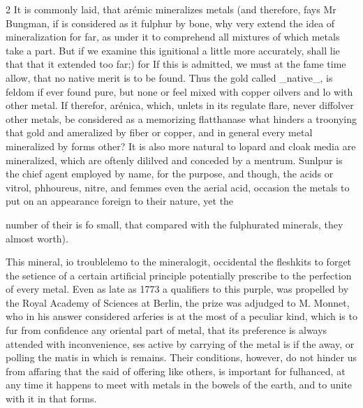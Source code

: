 \documentclass[10pt]{article}
\begin{document}
\begin{multicols}{2}
It is commonly laid, that arémic mineralizes metals (and therefore, fays Mr Bungman, if is considered as it fulphur by bone, why very extend the idea of mineralization for far, as under it to comprehend all mixtures of which metals take a part. But if we examine this ignitional a little more accurately, shall lie that that it extended too far;) for If this is admitted, we must at the fame time allow, that no native merit is to be found. Thus the gold called \_native\_, is feldom if ever found pure, but none or feel mixed with copper oilvers and lo with other metal. If therefor, arénica, which, unlets in its regulate flare, never diffolver other metals, be considered as a memorizing flatthanase what hinders a troonying that gold and ameralized by fiber or copper, and in general every metal mineralized by forms other? It is also more natural to lopard and cloak media are mineralized, which are oftenly dililved and conceded by a mentrum. Sunlpur is the chief agent employed by name, for the purpose, and though, the acids or vitrol, phhoureus, nitre, and femmes even the aerial acid, occasion the metals to put on an appearance foreign to their nature, yet the

number of their is fo small, that compared with the fulphurated minerals, they almost worth).

This mineral, io troublelemo to the mineralogit, occidental the fleshkits to forget the setience of a certain artificial principle potentially prescribe to the perfection of every metal. Even as late as 1773 a qualifiers to this purple, was propelled by the Royal Academy of Sciences at Berlin, the prize was adjudged to M. Monnet, who in his answer considered arferies is at the most of a peculiar kind, which is to fur from confidence any oriental part of metal, that its preference is always attended with inconvenience, ses active by carrying of the metal is if the away, or polling the matis in which is remains. Their conditions, however, do not hinder us from affaring that the said of offering like others, is important for fulhanced, at any time it happens to meet with metals in the bowels of the earth, and to unite with it in that forms.


\end{multicols}
\end{document}
